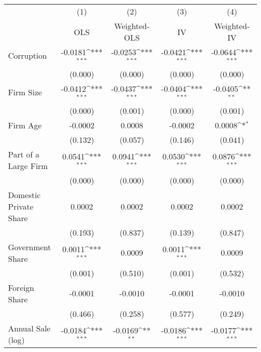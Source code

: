 {
\def\sym#1{\ifmmode^{#1}\else\(^{#1}\)\fi}
\begin{tabular}{l*{4}{c}}
\hline\hline
                    &\multicolumn{1}{c}{(1)}         &\multicolumn{1}{c}{(2)}         &\multicolumn{1}{c}{(3)}         &\multicolumn{1}{c}{(4)}         \\
                    &         OLS         &Weighted-OLS         &          IV         & Weighted-IV         \\
\hline
Corruption          &     -0.0181\sym{***}&     -0.0253\sym{***}&     -0.0421\sym{***}&     -0.0644\sym{***}\\
                    &     (0.000)         &     (0.000)         &     (0.000)         &     (0.000)         \\
Firm Size           &     -0.0412\sym{***}&     -0.0437\sym{***}&     -0.0404\sym{***}&     -0.0405\sym{**} \\
                    &     (0.000)         &     (0.001)         &     (0.000)         &     (0.001)         \\
Firm Age            &     -0.0002         &      0.0008         &     -0.0002         &      0.0008\sym{*}  \\
                    &     (0.132)         &     (0.057)         &     (0.146)         &     (0.041)         \\
Part of a Large Firm&      0.0541\sym{***}&      0.0941\sym{***}&      0.0530\sym{***}&      0.0876\sym{***}\\
                    &     (0.000)         &     (0.000)         &     (0.000)         &     (0.000)         \\
Domestic Private Share&      0.0002         &      0.0002         &      0.0002         &      0.0002         \\
                    &     (0.193)         &     (0.837)         &     (0.139)         &     (0.847)         \\
Government Share    &      0.0011\sym{***}&      0.0009         &      0.0011\sym{***}&      0.0009         \\
                    &     (0.001)         &     (0.510)         &     (0.001)         &     (0.532)         \\
Foreign Share       &     -0.0001         &     -0.0010         &     -0.0001         &     -0.0010         \\
                    &     (0.466)         &     (0.258)         &     (0.577)         &     (0.249)         \\
Annual Sale (log)   &     -0.0184\sym{***}&     -0.0169\sym{**} &     -0.0186\sym{***}&     -0.0177\sym{***}\\

\end{tabular}}
